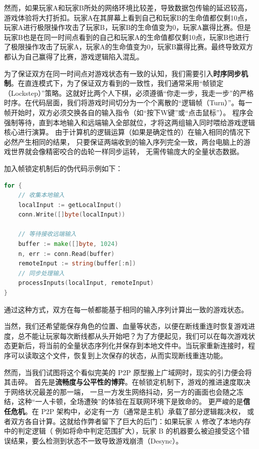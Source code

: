 然而，如果玩家A和玩家B所处的网络环境比较差，导致数据包传输的延迟较高，游戏体验将大打折扣。玩家A在其屏幕上看到自己和玩家B的生命值都仅剩10点，玩家A进行极限操作攻击了玩家B，玩家B的生命值变为0，玩家A赢得比赛。但是玩家B也是在同一时间点看到的自己和玩家A的生命值都仅剩10点，玩家B也进行了极限操作攻击了玩家A，玩家A的生命值变为0，玩家B赢得比赛。最终导致双方都认为自己赢得了比赛，游戏逻辑陷入混乱。

为了保证双方在同一时间点对游戏状态有一致的认知，我们需要引入\textbf{时序同步机制}。在直连模式下，为了保证双方看到的一致性，我们通常采用“帧锁定（Lockstep）”策略。这就好比两个人下棋，必须遵循“你走一步，我走一步”的严格时序。在代码层面，我们将游戏时间切分为一个个离散的“逻辑帧（Turn）”。每一帧开始时，双方必须交换各自的输入指令（如“按下W键”或“点击鼠标”）。
程序会强制等待，直到本地输入和远端输入全部就位，才将这两组输入同时喂给游戏逻辑核心进行演算。
由于计算机的逻辑运算（如果是确定性的）在输入相同的情况下必然产生相同的结果，
只要保证两端收到的输入序列完全一致，两台电脑上的游戏世界就会像精密咬合的齿轮一样同步运转，
无需传输庞大的全量状态数据。

加入帧锁定机制后的伪代码示例如下：
\begin{tcolorbox}[title=帧锁定机制示例]
\begin{lstlisting}[style=codeblock, language=go]
for {
    // 收集本地输入
    localInput := getLocalInput()
    conn.Write([]byte(localInput))

    // 等待接收远端输入
    buffer := make([]byte, 1024)
    n, err := conn.Read(buffer)
    remoteInput := string(buffer[:n])
    // 同步处理输入
    processInputs(localInput, remoteInput)
}
\end{lstlisting}
\end{tcolorbox}
通过这种方式，双方在每一帧都能基于相同的输入序列计算出一致的游戏状态。

当然，我们还希望能保存角色的位置、血量等状态，以便在断线重连时恢复游戏进度，总不能让玩家每次断线都从头开始吧？为了方便起见，我们可以在每次游戏状态更新后，将当前的全量状态序列化并保存到本地文件中。当玩家重新连接时，程序可以读取这个文件，恢复到上次保存的状态，从而实现断线重连功能。

然而，当我们试图将这个看似完美的 P2P 原型搬上广域网时，现实的引力便会将其击碎。
首先是\textbf{流畅度与公平性的博弈}。在帧锁定机制下，游戏的推进速度取决于网络状况最差的那一端，
一旦一方发生网络抖动，另一方的画面也会随之冻结，这种“一人卡顿，全场遭殃”的体验在互联网环境下是致命的。
更严峻的是\textbf{信任危机}。在 P2P 架构中，必定有一方（通常是主机）承载了部分逻辑裁决权，
或者双方各自计算。这就给作弊者留下了巨大的后门：如果玩家 A 修改了本地内存中的判定逻辑（
例如将命中判定范围扩大），玩家 B 的机器要么被迫接受这个错误结果，要么检测到状态不一致导致游戏崩溃（Desync）。

